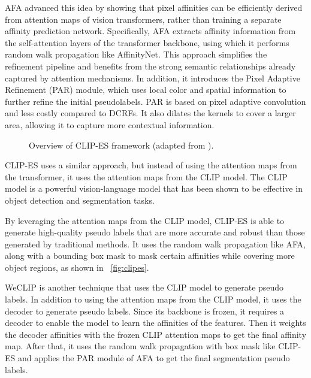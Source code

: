 AFA \cite{wsss_afa_affinity_from_attention} advanced this idea by showing that pixel affinities can be efficiently derived from attention maps of vision transformers, rather than training a separate affinity prediction network. Specifically, AFA extracts affinity information from the self-attention layers of the transformer backbone, using which it performs random walk propagation like AffinityNet. This approach simplifies the refinement pipeline and benefits from the strong semantic relationships already captured by attention mechanisms. In addition, it introduces the Pixel Adaptive Refinement (PAR) module, which uses local color and spatial information to further refine the initial pseudolabels. PAR is based on pixel adaptive convolution and less costly compared to DCRFs. It also dilates the kernels to cover a larger area, allowing it to capture more contextual information.

\begin{figure}[htbp]
    \centering
    \caption{Overview of CLIP-ES framework (adapted from \cite{wsss_clip_es}).}
    \label{fig:clipes}
\end{figure}

CLIP-ES \cite{wsss_clip_es} uses a similar approach, but instead of using the attention maps from the transformer, it uses the attention maps from the CLIP model. The CLIP model is a powerful vision-language model that has been shown to be effective in object detection and segmentation tasks. 

By leveraging the attention maps from the CLIP model, CLIP-ES is able to generate high-quality pseudo labels that are more accurate and robust than those generated by traditional methods. It uses the random walk propagation like AFA, along with a bounding box mask to mask certain affinities while covering more object regions, as shown in ~\autoref{fig:clipes}.

WeCLIP\cite{wsss_frozen_clip} is another technique that uses the CLIP model to generate pseudo labels. In addition to using the attention maps from the CLIP model, it uses the decoder to generate pseudo labels. Since its backbone is frozen, it requires a decoder to enable the model to learn the affinities of the features. Then it weights the decoder affinities with the frozen CLIP attention maps to get the final affinity map. After that, it uses the random walk propagation with box mask like CLIP-ES and applies the PAR module of AFA to get the final segmentation pseudo labels.
